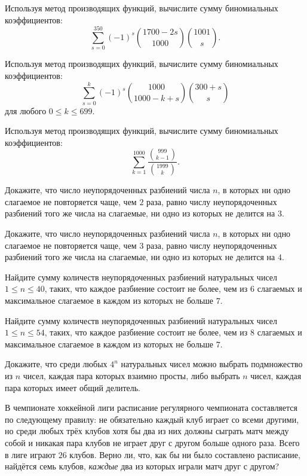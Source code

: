 Используя метод производящих функций, вычислите сумму биномиальных коэффициентов:
\[\sum_{s=0}^{350}(-1)^s \binom{1700-2s}{1000} \binom{1001}{s}.\]


Используя метод производящих функций, вычислите сумму биномиальных коэффициентов:
\[\sum_{s=0}^{k}(-1)^s \binom{1000}{1000-k+s}\binom{300+s}{s}\]
для любого $0\leqslant k\leqslant 699.$

Используя метод производящих функций, вычислите сумму биномиальных коэффициентов:
\[\sum\limits_{k=1}^{1000}\frac{\binom{999}{k-1}}{\binom{1999}{k}}.\]

Докажите, что число неупорядоченных разбиений числа $n$, в которых ни одно слагаемое не повторяется чаще, чем $2$ раза, равно числу неупорядоченных разбиений того же числа на слагаемые, ни одно из которых не делится на $3$.

Докажите, что число неупорядоченных разбиений числа $n$, в которых ни одно слагаемое не повторяется чаще, чем $3$ раза, равно числу неупорядоченных разбиений того же числа на слагаемые, ни одно из которых не делится на $4$.

Найдите сумму количеств неупорядоченных разбиений натуральных чисел $1\leqslant n\leqslant 40$, таких, что каждое разбиение состоит не более, чем из $6$ слагаемых и максимальное слагаемое в каждом из которых не больше $7$.

Найдите сумму количеств неупорядоченных разбиений натуральных чисел $1\leqslant n\leqslant 54$, таких, что каждое разбиение состоит не более, чем из $8$ слагаемых и максимальное слагаемое в каждом из которых не больше $7$.

Докажите, что среди любых $4^n$ натуральных чисел можно выбрать подмножество из $n$ чисел, каждая пара которых взаимно просты, либо выбрать $n$ чисел, каждая пара которых имеет общий делитель.

В чемпионате хоккейной лиги расписание регулярного чемпионата составляется по следующему правилу: не обязательно каждый клуб играет со всеми другими, но среди любых трёх клубов хотя бы два из них должны сыграть матч между собой и никакая пара клубов не играет друг с другом больше одного раза. Всего в лиге играют $26$ клубов. Верно ли, что, как бы ни было составлено расписание, найдётся семь клубов, \emph{каждые} два из которых играли матч друг с другом?

